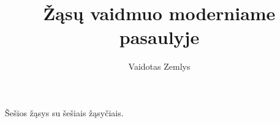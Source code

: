 \documentclass{article}
\begin{document}
\author{Vaidotas Zemlys}
\title{Žąsų vaidmuo moderniame pasaulyje}
\maketitle

Šešios žąsys su šešiais žąsyčiais.
\end{document}
